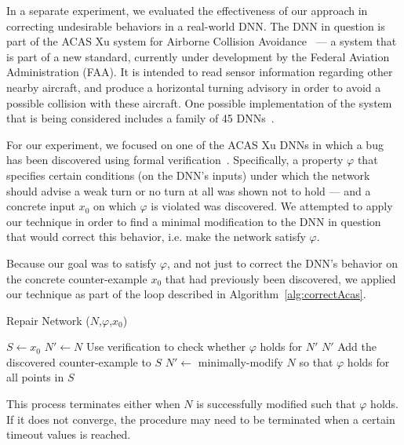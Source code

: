 \documentclass{easychair}
\begin{document}
In a separate experiment, we evaluated the effectiveness of our
approach in correcting undesirable behaviors in a real-world DNN. The
DNN in question is part of the ACAS Xu system for Airborne Collision
Avoidance~\cite{JuLoBrOwKo16} --- a system that is part of a new
standard, currently under development by the Federal Aviation
Administration (FAA). It is intended to
read sensor information regarding other nearby aircraft, and produce a
horizontal turning advisory in order to avoid a possible collision
with these aircraft. One possible implementation of the system that is
being considered includes a family of 45 DNNs~\cite{JuLoBrOwKo16}.

For our experiment, we focused on one of the ACAS Xu DNNs in which a
bug has been discovered using formal
verification~\cite{KaBaDiJuKo17Reluplex}. Specifically, a property
$\varphi$ that specifies certain conditions (on the DNN's inputs)
under which the network should advise a weak turn or no turn at all
was shown not to hold --- and a concrete input $x_0$ on which $\varphi$ is
violated was discovered. We attempted to apply our
technique in order to find a minimal modification to the DNN in question that
would correct this behavior, i.e. make the network satisfy $\varphi$.

Because our goal was to satisfy $\varphi$, and not just to correct the
DNN's behavior on the concrete counter-example $x_0$ that had previously
been discovered, we applied our technique as part of the loop
described in Algorithm~\ref{alg:correctAcas}.

\begin{algorithm}
\caption{Repair Network ($N$,$\varphi$,$x_0$)}
\begin{algorithmic}[1]
  \State $S\leftarrow x_0$
  \State $N'\leftarrow N$
  \State Use verification to check whether $\varphi$ holds for $N'$
    \State\Return $N'$
  \Else
    \State Add the discovered counter-example to $S$
    \State $N'\leftarrow$ minimally-modify $N$ so that $\varphi$
    holds for all points in $S$
    \EndIf
    \EndWhile
\end{algorithmic}
\label{alg:correctAcas}
\end{algorithm}

This process terminates either when $N$ is successfully modified such
that $\varphi$ holds. If it does not converge, the procedure may need
to be terminated when a certain timeout values is reached.
\end{document}
